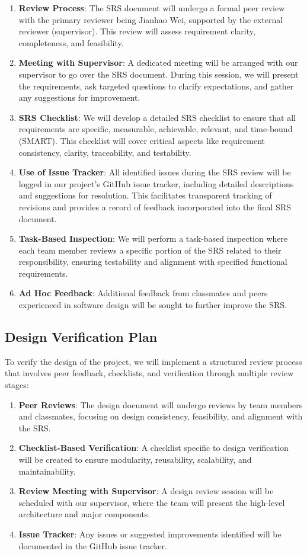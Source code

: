 \documentclass[12pt, titlepage]{article}
\begin{document}
\begin{enumerate}
    \item \textbf{Review Process}: The SRS document will undergo a formal peer review with the primary reviewer being Jianhao Wei, supported by the external reviewer (supervisor). This review will assess requirement clarity, completeness, and feasibility.
    \item \textbf{Meeting with Supervisor}: A dedicated meeting will be arranged with our supervisor to go over the SRS document. During this session, we will present the requirements, ask targeted questions to clarify expectations, and gather any suggestions for improvement.
    \item \textbf{SRS Checklist}: We will develop a detailed SRS checklist to ensure that all requirements are specific, measurable, achievable, relevant, and time-bound (SMART). This checklist will cover critical aspects like requirement consistency, clarity, traceability, and testability.
    \item \textbf{Use of Issue Tracker}: All identified issues during the SRS review will be logged in our project’s GitHub issue tracker, including detailed descriptions and suggestions for resolution. This facilitates transparent tracking of revisions and provides a record of feedback incorporated into the final SRS document.
    \item \textbf{Task-Based Inspection}: We will perform a task-based inspection where each team member reviews a specific portion of the SRS related to their responsibility, ensuring testability and alignment with specified functional requirements.
    \item \textbf{Ad Hoc Feedback}: Additional feedback from classmates and peers experienced in software design will be sought to further improve the SRS.
\end{enumerate}

\subsection{Design Verification Plan}
To verify the design of the project, we will implement a structured review process that involves peer feedback, checklists, and verification through multiple review stages:

\begin{enumerate}
    \item \textbf{Peer Reviews}: The design document will undergo reviews by team members and classmates, focusing on design consistency, feasibility, and alignment with the SRS.
    \item \textbf{Checklist-Based Verification}: A checklist specific to design verification will be created to ensure modularity, reusability, scalability, and maintainability.
    \item \textbf{Review Meeting with Supervisor}: A design review session will be scheduled with our supervisor, where the team will present the high-level architecture and major components.
    \item \textbf{Issue Tracker}: Any issues or suggested improvements identified will be documented in the GitHub issue tracker.
\end{enumerate}
\end{document}
